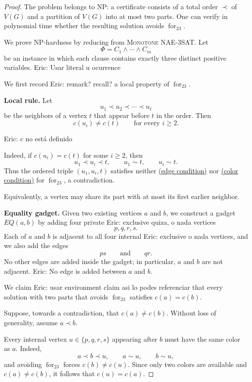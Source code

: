 \documentclass[12pt]{article}
\theoremstyle{plain}
\theoremstyle{definition}
\theoremstyle{remark}
\theoremstyle{definition}
\newcommand{\edgecondition}{%
  \hyperref[def:avoid:cond:edge]{(edge condition)}\xspace
}
\newcommand{\colorcondition}{%
  \hyperref[def:avoid:cond:color]{(color condition)}\xspace
}
\newcommand{\eric}[1]{%
  \textcolor{green!50!black}{Eric: #1}%
}
\begin{document}
\begin{proof}
The problem belongs to NP: a certificate consists of a total order \(\prec\) of \(V(G)\) and a partition of
\(V(G)\) into at most two parts. One can verify in polynomial time whether the resulting solution avoids
\(\operatorname{for}_{23}\).

We prove NP-hardness by reducing from \textsc{Monotone NAE-3SAT}. Let
\[
\Phi=C_1\land\cdots\land C_m
\]
be an instance in which each clause contains exactly three distinct positive variables.\eric{Usar literal u ocurrence}

We first record\eric{remark? recall?} a local property of \(\operatorname{for}_{23}\).

\medskip
\noindent\textbf{Local rule.}
Let
\[
u_1\prec u_2\prec\cdots\prec u_\ell
\]
be the neighbors of a vertex \(t\) that appear before \(t\) in the order.
Then
\[
c(u_i)\neq c(t)
\qquad\text{for every }i\ge 2.
\]

\eric{c no está definido}

Indeed, if \(c(u_i)=c(t)\) for some \(i\ge2\), then
\[
u_1\prec u_i\prec t,
\qquad
u_1\sim t,
\qquad
u_i\sim t.
\]
Thus the ordered triple \((u_1,u_i,t)\) satisfies neither \edgecondition{} nor \colorcondition{} for
\(\operatorname{for}_{23}\), a contradiction.

Equivalently, a vertex may share its part with at most its first earlier neighbor.

\medskip
\noindent\textbf{Equality gadget.}
Given two existing vertices \(a\) and \(b\), we construct a gadget \(EQ(a,b)\) by adding four private\eric{exclusive quiza, o nada} vertices
\[
p,q,r,s.
\]
Each of \(a\) and \(b\) is adjacent to all four internal\eric{exclusive o nada} vertices, and we also add the edges
\[
ps
\qquad\text{and}\qquad
qr.
\]
No other edges are added inside the gadget; in particular, \(a\) and \(b\) are not adjacent.\eric{No edge is added between \(a\) and \(b\).}

We claim\eric{usar environment claim asi lo podes referenciar} that every solution with two parts that avoids \(\operatorname{for}_{23}\) satisfies
\(
c(a)=c(b).
\)

Suppose, towards a contradiction, that
\(
c(a)\neq c(b).
\)
Without loss of generality, assume
\(
a\prec b.
\)

Every internal vertex \(u\in\{p,q,r,s\}\) appearing after \(b\) must have the same color as \(a\). Indeed,
\[
a\prec b\prec u,
\qquad
a\sim u,
\qquad
b\sim u,
\]
and avoiding \(\operatorname{for}_{23}\) forces \(c(b)\neq c(u)\). Since only two colors are available and
\(c(a)\neq c(b)\), it follows that \(c(u)=c(a)\).


\end{proof}
\end{document}
